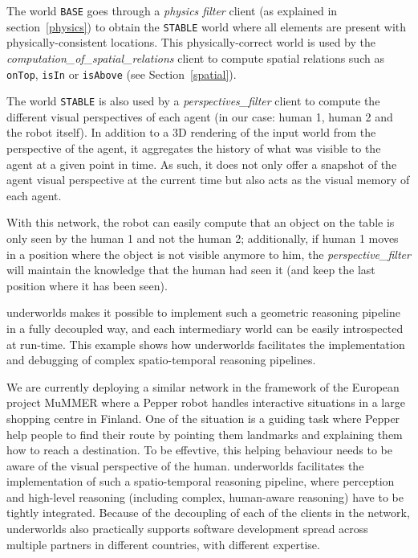 \documentclass[letterpaper, 10pt, conference]{ieeeconf}
\newcommand{\uwds}{{\sc underworlds}\xspace}
\begin{document}
The world \texttt{BASE} goes through a \textit{physics filter} client (as
explained in section~\ref{physics}) to obtain the \texttt{STABLE} world where all
elements are present with physically-consistent locations. This
physically-correct world is used by the
\textit{computation\_of\_spatial\_relations} client to compute spatial relations
such as {\tt onTop}, {\tt isIn} or {\tt isAbove} (see Section~\ref{spatial}).

The world \texttt{STABLE} is also used by a \textit{perspectives\_filter} client
to compute the different visual perspectives of each agent (in our case: human
1, human 2 and the robot itself). In addition to a 3D rendering of the input
world from the perspective of the agent, it aggregates the history of what was
visible to the agent at a given point in time. As such, it does not only offer a
snapshot of the agent visual perspective at the current time but also acts as the
visual memory of each agent.


With this network, the robot can easily compute that an object on
the table is only seen by the human 1 and not the human 2; additionally, if
human 1 moves in a position where the object is not visible anymore to him, the
\textit{perspective\_filter} will maintain the knowledge that the human had
seen it (and keep the last position where it has been seen).

\uwds makes it possible to implement such a geometric reasoning pipeline in a
fully decoupled way, and each intermediary world can be easily introspected at
run-time. This example shows how \uwds facilitates the implementation and
debugging of complex spatio-temporal reasoning pipelines.


We are currently deploying a similar network in the framework of the European
project MuMMER where a Pepper robot handles interactive situations in a large
shopping centre in Finland. One of the situation is a guiding task where Pepper
help people to find their route by pointing them landmarks and explaining them
how to reach a destination. To be effevtive, this helping behaviour needs to be
aware of the visual perspective of the human. \uwds facilitates the
implementation of such a spatio-temporal reasoning pipeline, where perception
and high-level reasoning (including complex, human-aware reasoning) have to be
tightly integrated. Because of the decoupling of each of the clients in the
network, \uwds also practically supports software development spread across
multiple partners in different countries, with different expertise.
\end{document}
